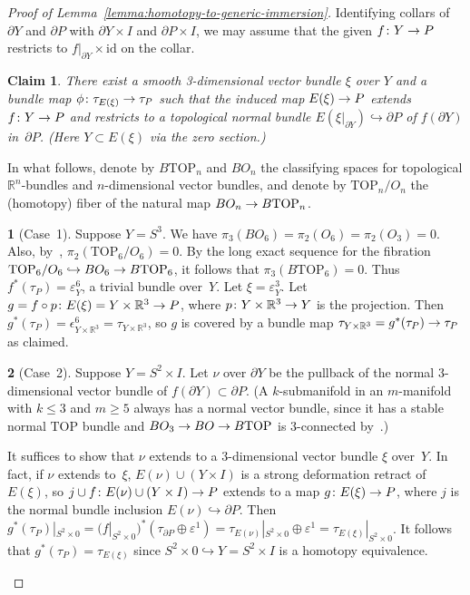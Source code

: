 \documentclass[11pt]{amsart}
\def\to{\mathchoice{\longrightarrow}{\rightarrow}{\rightarrow}{\rightarrow}}
\newtheorem*{claim}{Claim}
\theoremstyle{definition}
\theoremstyle{theorem-giventitle}
\theoremstyle{definition-giventitle}
\newtheorem{step-named}{}
\numberwithin{equation}{section}
\def\R{\mathbb{R}}
\def\id{\mathrm{id}}
\def\TOP{\mathrm{TOP}}
\begin{document}
\begin{proof}[Proof of Lemma~\ref{lemma:homotopy-to-generic-immersion}]
  Identifying collars of $\partial Y$ and $\partial P$ with $\partial Y\times I$ and $\partial P\times I$, we may assume that the given $f\colon Y\to P$ restricts to $f|_{\partial Y}\times\id$ on the collar.

  \begin{claim}
    \hskip-1pt There exist a smooth 3-dimensional vector bundle $\xi$ over $Y$ \kern-1.6pt and a bundle map $\phi\colon \tau_{E(\xi)} \to \tau_P$ such that the induced map $E(\xi)\to P$ extends $f\colon Y\to P$ and restricts to a topological normal bundle $E(\xi|_{\partial Y}) \hookrightarrow \partial P$ of $f(\partial Y)$ in~$\partial P$.
    (Here $Y\subset E(\xi)$ via the zero section.)
  \end{claim}

  In what follows, denote by $B\TOP_n$ and $BO_n$ the classifying spaces for topological $\R^n$-bundles and $n$-dimensional vector bundles, and denote by $\TOP_n/O_n$ the (homotopy) fiber of the natural map $BO_n \to B\TOP_n$.

  \begin{step-named}[Case~1]
    Suppose $Y=S^3$.
    We have $\pi_3(BO_6)=\pi_2(O_6)=\pi_2(O_3)=0$.
    Also, by~\cite[Essay V, p~246]{Kirby-Siebenmann:1977-1}, $\pi_2(\TOP_6/O_6) = 0$.
    By the long exact sequence for the fibration $\TOP_6/O_6 \hookrightarrow BO_6 \to B\TOP_6$, it follows that $\pi_3(B\TOP_6)=0$.
    Thus $f^*(\tau_P)=\varepsilon^6_Y$, a trivial bundle over~$Y$.
    Let $\xi=\varepsilon^3_Y$.
    Let $g=f\circ p\colon E(\xi)=Y\times \R^3 \to P$, where $p\colon Y\times \R^3\to Y$ is the projection.
    Then $g^*(\tau_P) =\epsilon^6_{Y\times\R^3} = \tau_{Y\times \R^3}$, so $g$ is covered by a bundle map $\tau_{Y\times \R^3} = g^*(\tau_P) \to \tau_P$ as claimed.
  \end{step-named}

  \begin{step-named}[Case~2]
    Suppose $Y=S^2\times I$.
    Let $\nu$ over $\partial Y$ be the pullback of the normal 3-dimensional vector bundle of $f(\partial Y)\subset \partial P$.
    (A $k$-submanifold in an $m$-manifold with $k\le 3$ and $m\ge 5$ always has a normal vector bundle, since it has a stable normal $\TOP$ bundle and $BO_3 \to BO \to B\TOP$ is 3-connected by~\cite[Essay V, p~246]{Kirby-Siebenmann:1977-1}.)

    It suffices to show that $\nu$ extends to a 3-dimensional vector bundle $\xi$ over~$Y$.
    In fact, if $\nu$ extends to~$\xi$, $E(\nu) \cup (Y\times I)$ is a strong deformation retract of~$E(\xi)$, so $j \cup f\colon E(\nu) \cup (Y\times I) \to P$ extends to a map $g\colon E(\xi) \to P$, where $j$ is the normal bundle inclusion $E(\nu) \hookrightarrow \partial P$.
    Then $g^*(\tau_P)|_{S^2\times 0} = (f|_{S^2\times 0})^*(\tau_{\partial P}\oplus \varepsilon^1) = \tau_{E(\nu)}|_{S^2\times 0} \oplus \varepsilon^1 = \tau_{E(\xi)}|_{S^2\times 0}$.
    It follows that $g^*(\tau_P) = \tau_{E(\xi)}$ since $S^2\times 0 \hookrightarrow Y=S^2\times I$ is a homotopy equivalence.


\end{step-named}
\end{proof}
\end{document}
